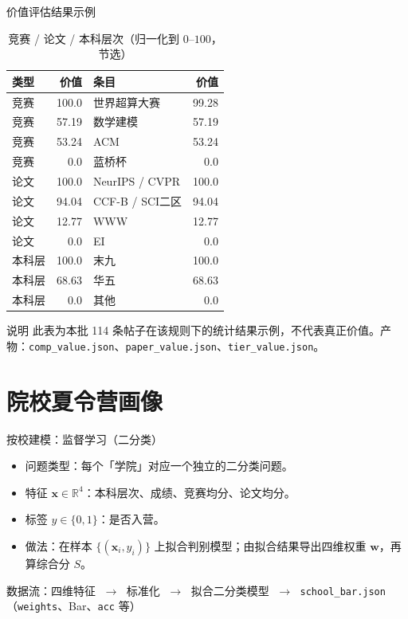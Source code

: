 \documentclass[10pt, aspectratio=169]{beamer}
\begin{document}
\begin{frame}{价值评估结果示例}
    \begin{table}[]
        \centering
        \caption{竞赛 / 论文 / 本科层次（归一化到 $0$--$100$，节选）}
        \scriptsize
        \begin{tabular}{l|r|l|r}
        \toprule
        类型 & 价值 & 条目 & 价值 \\ \midrule
        竞赛 & 100.0 & 世界超算大赛 & 99.28 \\
        竞赛 & 57.19 & 数学建模 & 57.19 \\
        竞赛 & 53.24 & ACM & 53.24 \\
        竞赛 & 0.0 & 蓝桥杯 & 0.0 \\
        \midrule
        论文 & 100.0 & NeurIPS / CVPR & 100.0 \\
        论文 & 94.04 & CCF-B / SCI二区 & 94.04 \\
        论文 & 12.77 & WWW & 12.77 \\
        论文 & 0.0 & EI & 0.0 \\
        \midrule
        本科层 & 100.0 & 末九 & 100.0 \\
        本科层 & 68.63 & 华五 & 68.63 \\
        本科层 & 0.0 & 其他 & 0.0 \\
        \bottomrule
        \end{tabular}
    \end{table}
    \begin{block}{说明}
        此表为本批 114 条帖子在该规则下的统计结果示例，不代表真正价值。产物：\texttt{comp\_value.json}、\texttt{paper\_value.json}、\texttt{tier\_value.json}。
    \end{block}
\end{frame}

\section{院校夏令营画像}

\begin{frame}{按校建模：监督学习（二分类）}
    \small
    \begin{itemize}\setlength{\itemsep}{0.25em}
        \item 问题类型：每个「学院」对应一个独立的二分类问题。
        \item 特征 $\mathbf{x}\in\mathbb{R}^4$：本科层次、成绩、竞赛均分、论文均分。
        \item 标签 $y\in\{0,1\}$：是否入营。
        \item 做法：在样本 $\{(\mathbf{x}_i,y_i)\}$ 上拟合判别模型；由拟合结果导出四维权重 $\mathbf{w}$，再算综合分 $S$。
    \end{itemize}
    \vspace{0.25cm}
    \centering
    \footnotesize
    数据流：\quad 四维特征 $\;\longrightarrow\;$ 标准化 $\;\longrightarrow\;$ 拟合二分类模型 $\;\longrightarrow\;$ \texttt{school\_bar.json}（\texttt{weights}、Bar、\texttt{acc} 等）
\end{frame}
\end{document}
